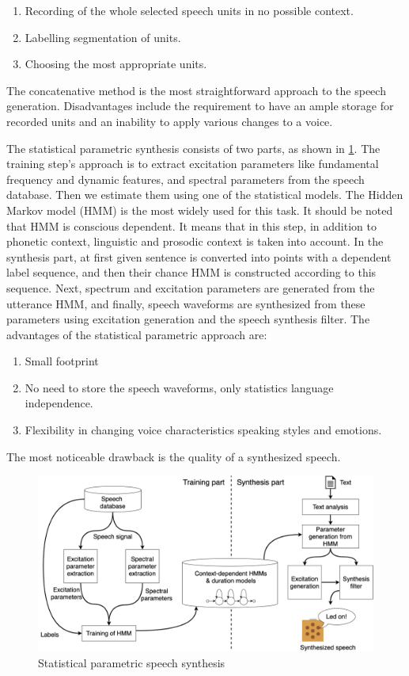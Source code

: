 \begin{enumerate}
    \item Recording of the whole selected speech units in no possible context.
    \item Labelling segmentation of units.
    \item Choosing the most appropriate units. 
\end{enumerate}

The concatenative method is the most straightforward approach to the speech generation. Disadvantages include the requirement to have an ample storage for recorded units and an inability to apply various changes to a voice.

The statistical parametric synthesis consists of two parts, as shown in \cref{fig:synthesis_model}. The training step's approach is to extract excitation parameters like fundamental frequency and dynamic features, and spectral parameters from the speech database. Then we estimate them using one of the statistical models. The Hidden Markov model (HMM) is the most widely used for this task. It should be noted that HMM is conscious dependent. It means that in this step, in addition to phonetic context, linguistic and prosodic context is taken into account. In the synthesis part, at first given sentence is converted into points with a dependent label sequence, and then their chance HMM is constructed according to this sequence. Next, spectrum and excitation parameters are generated from the utterance HMM, and finally, speech waveforms are synthesized from these parameters using excitation generation and the speech synthesis filter. The advantages of the statistical parametric approach are:
\begin{enumerate}
    \item Small footprint
    \item No need to store the speech waveforms, only statistics language independence.
    \item Flexibility in changing voice characteristics speaking styles and emotions.
\end{enumerate}
The most noticeable drawback is the quality of a synthesized speech.

\begin{figure}[H]
    \centering
    \includegraphics[width=\textwidth]{img/synthesis_model.png}
    \caption{Statistical parametric speech synthesis \citep{statistical_parametric_speech_synthesis_ZEN20091039}}
    \label{fig:synthesis_model}
\end{figure}


